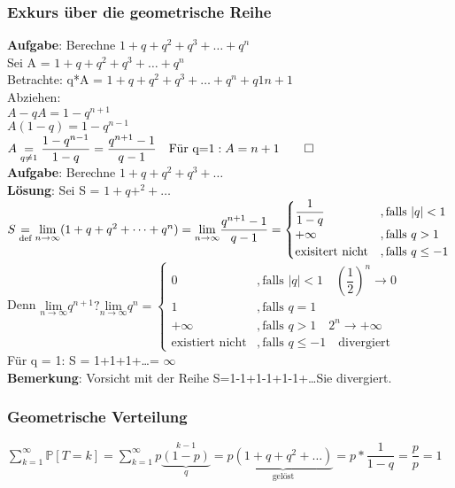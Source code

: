 \subsubsection{Exkurs über die geometrische Reihe}
\textbf{Aufgabe}: Berechne $1+q+q^2+q^3+\dots+q^n$\smallskip\\
Sei A = $1+q+q^2+q^3+\dots+q^n$\\
Betrachte: q*A = $1+q+q^2+q^3+\dots+q^n+q1 {n+1}$\smallskip\\
Abziehen:\\
$A-qA = 1-q^{n+1}$\\
$A(1-q)=1-q^{n-1}$\smallskip\\
$A \underset{q\neq 1}{=} \dfrac{1-q^{n-1}}{1-q}=\dfrac{q^{n+1}-1}{q-1} \quad \text{Für q=1}: A=n+1 \qed$\smallskip\\
\textbf{Aufgabe}: Berechne $1+q+q^2+q^3+\dots$\\
\textbf{Lösung}: Sei S = $1+q+^2+\dots$\medskip\\
$S \underset{\text{def}}{=} \underset{n\rightarrow\infty}{\text{lim}}(1+q+q^2+\dots+q^n)= \underset{n\rightarrow\infty}{\text{lim}} \dfrac{q^{n+1}-1}{q-1} = \begin{cases}
\dfrac{1}{1-q}&,\text{falls }|q|<1\\
+\infty &,\text{falls }q>1\\
\text{exisitert nicht}&,\text{falls }q\leq -1
\end{cases}\medskip\\$\medskip\\
Denn $\underset{n\rightarrow\infty}{\text{lim}}q^{n+1}?\underset{n\rightarrow\infty}{\text{lim}}q^n=
\begin{cases}
0 &,\text{falls } |q|<1\quad (\dfrac{1}{2})^n \rightarrow 0\\
1&,\text{falls } q = 1\\
+\infty &, \text{falls }q >1 \quad 2^n \rightarrow+\infty\\
\text{existiert nicht}&,\text{falls }q \leq -1\quad \text{divergiert}
\end{cases}$\smallskip\\
Für q = 1: S = 1+1+1+\dots = $\infty$\medskip\\
\textbf{Bemerkung}: Vorsicht mit der Reihe S=1-1+1-1+1-1+\dots Sie divergiert.
\subsubsection{Geometrische Verteilung}
$\sum_{k=1}^\infty \mathds{P}[T=k]=\sum_{k=1}^\infty p\underbrace{(1-p)}_q^{k-1} = p\underbrace{(1+q+q^2+\dots)}_\text{gelöst} = p*\dfrac{1}{1-q}=\dfrac{p}{p}=1$
